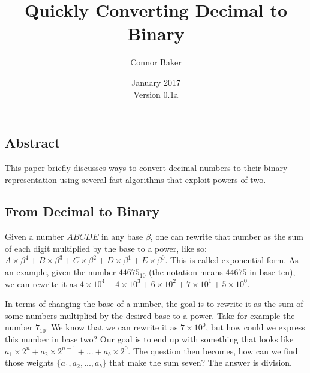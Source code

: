 \documentclass[12pt]{article}
\begin{document}

  \title{Quickly Converting Decimal to Binary}
  \author{Connor Baker}
  \date{January 2017\\Version 0.1a}
\maketitle

\begin{center}
\subsection*{Abstract}
\end{center}
This paper briefly discusses ways to convert decimal numbers to their binary representation using several fast algorithms that exploit powers of two.



\newpage %



\makeatletter
{}
\makeatother
\tableofcontents

\clearpage
{}



\newpage %



\begin{center}
\section{From Decimal to Binary}
\end{center}
Given a number $ABCDE$ in any base $\beta$, one can rewrite that number as the sum of each digit multiplied by the base to a power, like so: $A\times\beta^4 + B\times\beta^3 + C\times\beta^2 + D\times\beta^1 + E\times\beta^0$. This is called exponential form. As an example, given the number $44675_{10}$ (the notation means $44675$ in base ten), we can rewrite it as $4\times10^4 + 4\times10^3 + 6\times10^2 + 7\times10^1 + 5\times10^0$.

\par In terms of changing the base of a number, the goal is to rewrite it as the sum of some numbers multiplied by the desired base to a power. Take for example the number $7_{10}$. We know that we can rewrite it as $7\times10^0$, but how could we express this number in base two? Our goal is to end up with something that looks like $a_1\times2^{n} + a_2\times2^{n-1} + ... + a_b\times2^0$. The question then becomes, how can we find those weights $\{a_1, a_2, ..., a_b\}$ that make the sum seven? The answer is division. \\
\end{document}
